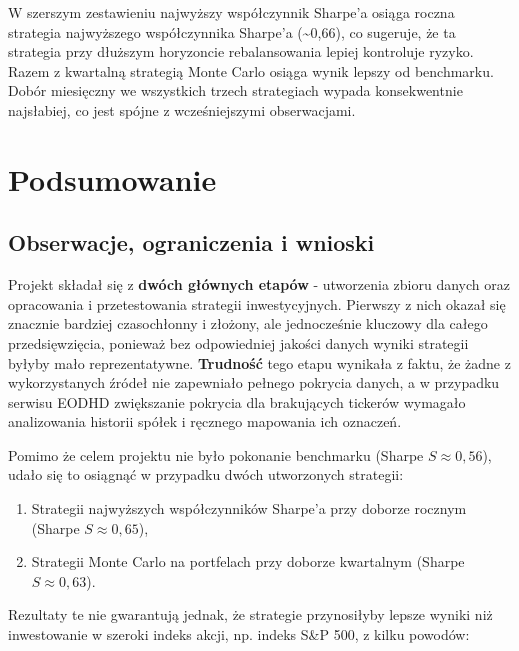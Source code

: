 \documentclass[12pt, a4paper]{article}
\begin{document}
W szerszym zestawieniu najwyższy współczynnik Sharpe'a osiąga roczna strategia najwyższego współczynnika Sharpe'a (\textasciitilde{}0{,}66), co sugeruje, że ta strategia przy dłuższym horyzoncie rebalansowania lepiej kontroluje ryzyko. Razem z kwartalną strategią Monte Carlo osiąga wynik lepszy od benchmarku. Dobór miesięczny we wszystkich trzech strategiach wypada konsekwentnie najsłabiej, co jest spójne z wcześniejszymi obserwacjami.

\section{Podsumowanie}

\subsection{Obserwacje, ograniczenia i wnioski}

Projekt składał się z \textbf{dwóch głównych etapów} - utworzenia zbioru danych oraz opracowania i przetestowania strategii inwestycyjnych. Pierwszy z nich okazał się znacznie bardziej czasochłonny i złożony, ale jednocześnie kluczowy dla całego przedsięwzięcia, ponieważ bez odpowiedniej jakości danych wyniki strategii byłyby mało reprezentatywne. \textbf{Trudność} tego etapu wynikała z faktu, że żadne z wykorzystanych źródeł nie zapewniało pełnego pokrycia danych, a w przypadku serwisu EODHD zwiększanie pokrycia dla brakujących tickerów wymagało analizowania historii spółek i ręcznego mapowania ich oznaczeń.

Pomimo że celem projektu nie było pokonanie benchmarku (Sharpe $S \approx 0{,}56$), udało się to osiągnąć w przypadku dwóch utworzonych strategii:

\begin{enumerate}
    \item Strategii najwyższych współczynników Sharpe’a przy doborze rocznym (Sharpe $S \approx 0{,}65$),
    \item Strategii Monte Carlo na portfelach przy doborze kwartalnym (Sharpe $S \approx 0{,}63$).
\end{enumerate}

Rezultaty te nie gwarantują jednak, że strategie przynosiłyby lepsze wyniki niż inwestowanie w szeroki indeks akcji, np. indeks S\&P 500, z kilku powodów:
\end{document}
